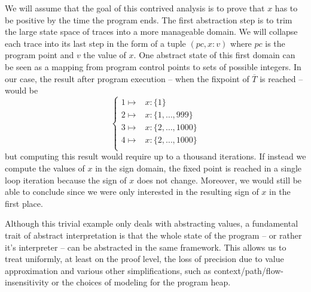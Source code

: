 \documentclass[11pt]{article}
\begin{document}
We will assume that the goal of this contrived analysis is to prove that $x$ has to be positive by the time the program ends. The first abstraction step is to trim the large state space of traces into a more manageable domain. We will collapse each trace into its last step in the form of a tuple $\left(pc,x:v\right)$ where $pc$ is the program point and $v$ the value of $x$. One abstract state of this first domain can be seen as a mapping from program control points to sets of possible integers. In our case, the result after program execution -- when the fixpoint of $\overline{T}$ is reached -- would be
\[
\begin{cases}
1 \mapsto & x:\{1\} \\
2 \mapsto & x:\{1, \dots, 999\} \\
3 \mapsto & x:\{2, \dots, 1000\} \\
4 \mapsto & x:\{2, \dots, 1000\} \\
\end{cases}
\]
but computing this result would require up to a thousand iterations. If instead we compute the values of $x$ in the sign domain, the fixed point is reached in a single loop iteration because the sign of $x$ does not change. Moreover, we would still be able to conclude since we were only interested in the resulting sign of $x$ in the first place.

Although this trivial example only deals with abstracting values, a fundamental trait of abstract interpretation is that the whole state of the program -- or rather it's interpreter -- can be abstracted in the same framework. This allows us to treat uniformly, at least on the proof level, the loss of precision due to value approximation and various other simplifications, such as context/path/flow-insensitivity or the choices of modeling for the program heap. 
\end{document}
